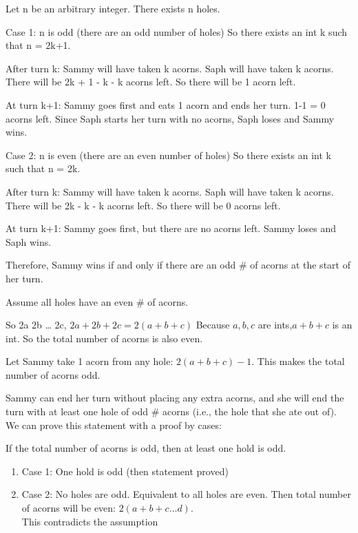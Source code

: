 \documentclass[12pt]{exam}
\begin{document}
\begin{solution}
\begin{qparts}
    \item 
    Let n be an arbitrary integer. There exists n holes.

Case 1: n is odd (there are an odd number of holes)
So there exists an int k such that n = 2k+1.

After turn k:
Sammy will have taken k acorns.
Saph will have taken k acorns.
There will be 2k + 1 - k - k acorns left.
So there will be 1 acorn left.

At turn k+1:
Sammy goes first and eats 1 acorn and ends her turn.
1-1 = 0 acorns left.
Since Saph starts her turn with no acorns, Saph loses and Sammy wins.

Case 2: n is even (there are an even number of holes)
So there exists an int k such that n = 2k.

After turn k:
Sammy will have taken k acorns.
Saph will have taken k acorns.
There will be 2k - k - k acorns left.
So there will be 0 acorns left.

At turn k+1:
Sammy goes first, but there are no acorns left. Sammy loses and Saph wins.

Therefore, Sammy wins if and only if there are an odd \# of acorns at the start of her turn.

\item 
Assume all holes have an even \# of acorns.

So 2a 2b … 2c, $2a + 2b + 2c = 2(a+b+c)$
Because $a,b, c$ are ints,$ a+b+c$ is an int. So the total number of acorns is also even.

Let Sammy take 1 acorn from any hole:
$2(a+b+c) - 1$.
This makes the total number of acorns odd.

Sammy can end her turn without placing any extra acorns, and she will end the turn with at least one hole of odd \# acorns (i.e., the hole that she ate out of). We can prove this statement with a proof by cases: 

If the total number of acorns is odd, then at least one hold is odd.
\begin{enumerate}
    \item Case 1: One hold is odd (then statement proved)
    \item Case 2: No holes are odd. Equivalent to all holes are even. Then total number of acorns will be even: $2(a+b+c…d)$.\\
    This contradicts the assumption
\end{enumerate}


\end{qparts}
\end{solution}
\end{document}
